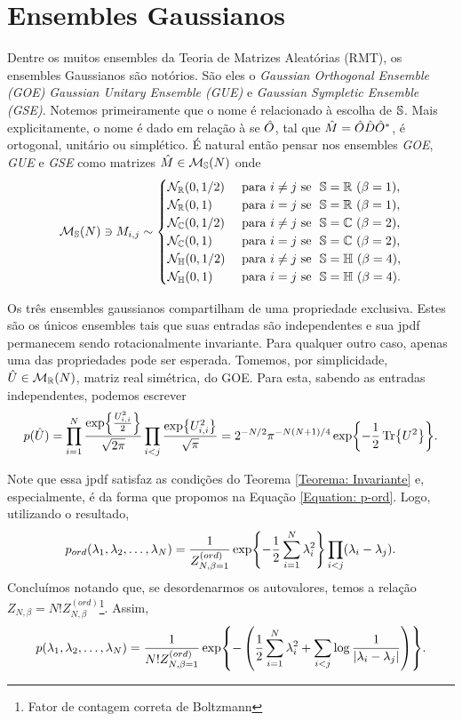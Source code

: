 \section{Ensembles Gaussianos}
\label{Section: Ensembles Gaussianos}

Dentre os muitos ensembles da Teoria de Matrizes Aleatórias (RMT), os ensembles Gaussianos são notórios. São eles o \textit{Gaussian Orthogonal Ensemble (GOE)} \textit{Gaussian Unitary Ensemble (GUE)} e \textit{Gaussian Sympletic Ensemble (GSE)}. Notemos primeiramente que o nome é relacionado à escolha de $\mathbb{S}$. Mais explicitamente, o nome é dado em relação à se $\hat O$, tal que $\hat M = \hat O\hat D\hat O^*$, é ortogonal, unitário ou simplético. É natural então pensar nos ensembles \textit{GOE}, \textit{GUE} e \textit{GSE} como matrizes $\hat M \in \mathcal{M}_{\mathbb{S}}(N)$ onde 
$$ 
\mathcal{M}_{\Se}(N) \ni M_{i,j} \sim
\begin{cases}
	\mathcal{N}_{\R}(0,1/2) &  \ \text{para} \ i \neq j \ \text{se} \ \ \Se = \R \ (\beta = 1),\\
	\mathcal{N}_{\R}(0,1) & \ \text{para} \ i = j \ \text{se} \ \ \Se = \R \ (\beta = 1),\\
	\mathcal{N}_{\C}(0,1/2)  & \ \text{para} \ i \neq j \ \text{se} \ \ \Se = \C \ (\beta = 2),\\
	\mathcal{N}_{\C}(0,1) & \ \text{para} \ i = j \ \text{se} \ \ \Se = \C \ (\beta = 2),\\
	\mathcal{N}_{\He}(0,1/2) & \ \text{para} \ i \neq j \ \text{se} \ \ \Se = \He \ (\beta = 4), \\
	\mathcal{N}_{\He}(0,1) & \ \text{para} \ i = j \ \text{se} \ \ \Se = \He \ (\beta = 4).
\end{cases} $$


Os três ensembles gaussianos compartilham de uma propriedade exclusiva. Estes são os únicos ensembles tais que suas entradas são independentes e sua jpdf permanecem sendo rotacionalmente invariante. Para qualquer outro caso, apenas uma das propriedades pode ser esperada. Tomemos, por simplicidade, $\hat U \in \mathcal{M}_{\mathbb{R}}(N)$, matriz real simétrica, do GOE. Para esta, sabendo as entradas independentes, podemos escrever $$p(\hat U) = \prod_{i=1}^{N}\frac{\exp{\frac{U_{i,i}^2}{2}}}{\sqrt{2\pi}} \prod_{i<j} \frac{\exp{U_{i,i}^2}}{\sqrt{\pi}} = 2^{-N/2} \pi^{-N(N + 1)/4} \exp{-\frac{1}{2} \Tr{U^2}}.$$

Note que essa jpdf satisfaz as condições do Teorema \ref{Teorema: Invariante} e, especialmente, é da forma que propomos na Equação \ref{Equation: p-ord}. Logo, utilizando o resultado, $$ p_{ord}(\lambda_1, \lambda_2, \dots, \lambda_N) = \frac{1}{Z_{N, \beta = 1}^{(ord)}} \exp{-\frac{1}{2} \sum_{i = 1}^{N} \lambda_i^2} \prod_{i < j} (\lambda_i - \lambda_j).$$ Concluímos notando que, se desordenarmos os autovalores, temos a relação $ Z_{N, \beta} = N! Z_{N, \beta}^{(ord)}$\footnote{Fator de contagem correta de Boltzmann}. Assim, $$ p(\lambda_1, \lambda_2, \dots, \lambda_N) = \frac{1}{ N! Z_{N, \beta = 1}^{(ord)}} \exp{- \left(\frac{1}{2} \sum_{i = 1}^{N} \lambda_i^2 + \sum_{i < j} \log\frac{1}{|\lambda_i - \lambda_j|} \right)}.$$

